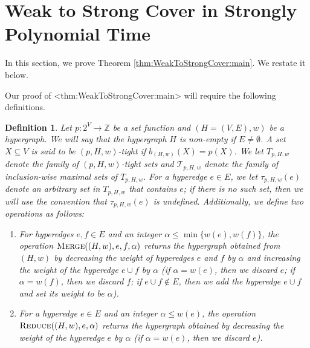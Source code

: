 \documentclass{article}
\def\Cref#1{<#1>}%
\newtheorem{definition}{Definition}[section]
\newcommand{\maximalTightSetFamily}[1]{\ensuremath{\calT_{#1}}\xspace}
\newcommand{\tightSetFamily}[1]{\ensuremath{T_{#1}}\xspace}
\newcommand{\shubhang}[1]{{\color{blue}[{\tiny Shubhang: \bf #1}]\marginpar{\color{blue}*}}}
\newcommand{\knote}[1]{{\color{red}[{\tiny Karthik: \bf #1}]\marginpar{\color{red}*}}}
\newcommand{\maximalTightSetContainingHyperedge}[1]{\ensuremath{\tau_{#1}}\xspace}
\newcommand{\merge}{\ensuremath{\textsc{Merge}}\xspace}
\newcommand{\reduce}{\ensuremath{\textsc{Reduce}}\xspace}
\providecommand{\Z}{\mathbb{Z}}
\providecommand{\calT}{\mathcal{T}}
\begin{document}
\section{Weak to Strong Cover in Strongly Polynomial Time}\label{sec:WeakToStrongCover}
In this section, we 
prove Theorem \ref{thm:WeakToStrongCover:main}. We restate it below. 
\thmWeakToStrongCover*

Our proof of \Cref{thm:WeakToStrongCover:main} will require the following definitions. 
\begin{definition}\label{def:(pHw)-tight-sets}
    Let $p:2^V\rightarrow\Z$ be a set function and $(H=(V,E), w)$ be a hypergraph. We will say that the hypergraph $H$ is \emph{non-empty} if $E\neq \emptyset$. 
    A set $X \subseteq V$ is said to be \emph{$(p, H, w)$-tight} if $b_{(H,w)}(X)=p(X)$. We let $\tightSetFamily{p,H,w}$ denote the family of $(p, H, w)$-tight sets and $\maximalTightSetFamily{p, H, w}$  denote the family of \emph{inclusion-wise maximal} sets of $\tightSetFamily{p,H,w}$. 
    For a hyperedge $e\in E$, we let $\maximalTightSetContainingHyperedge{p, H, w}(e)$ denote an arbitrary set in $\tightSetFamily{p, H, w}$ that contains $e$; if there is no such set, then we will use the convention that $\maximalTightSetContainingHyperedge{p, H, w}(e)$ is undefined.  
    Additionally, we define two operations as follows:
    \begin{enumerate}
        \item For hyperedges $e, f\in E$ and an integer  $\alpha\le \min\{w(e), w(f)\}$, the operation $\merge((H, w), e, f, \alpha)$ returns the hypergraph obtained from $(H, w)$ by decreasing the weight of hyperedges $e$ and $f$ by $\alpha$ and increasing the weight of the hyperedge $e\cup f$ by $\alpha$ (if $\alpha=w(e)$, then we discard $e$; if $\alpha=w(f)$, then we discard $f$; if $e\cup f\not\in E$, then we add the hyperedge $e\cup f$ and set its weight to be $\alpha$). 
        \item For a hyperedge $e\in E$ and an integer $\alpha \le w(e)$, the operation $\reduce((H, w), e, \alpha)$ returns the hypergraph obtained by decreasing the weight of the hyperedge $e$ by $\alpha$ (if $\alpha=w(e)$, then we discard $e$). 
    \end{enumerate}
\end{definition}
\end{document}
